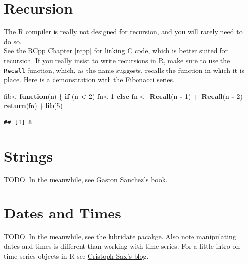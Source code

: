 \documentclass[]{book}
\newenvironment{Shaded}{\begin{snugshade}}{\end{snugshade}}
\newcommand{\KeywordTok}[1]{\textcolor[rgb]{0.13,0.29,0.53}{\textbf{#1}}}
\newcommand{\DecValTok}[1]{\textcolor[rgb]{0.00,0.00,0.81}{#1}}
\newcommand{\StringTok}[1]{\textcolor[rgb]{0.31,0.60,0.02}{#1}}
\newcommand{\ControlFlowTok}[1]{\textcolor[rgb]{0.13,0.29,0.53}{\textbf{#1}}}
\newcommand{\OperatorTok}[1]{\textcolor[rgb]{0.81,0.36,0.00}{\textbf{#1}}}
\newcommand{\NormalTok}[1]{#1}
\theoremstyle{definition}
\theoremstyle{definition}
\theoremstyle{definition}
\theoremstyle{remark}
\begin{document}
\section{Recursion}\label{recursion}

The R compiler is really not designed for recursion, and you will rarely
need to do so.\\
See the RCpp Chapter \ref{rcpp} for linking C code, which is better
suited for recursion. If you really insist to write recursions in R,
make sure to use the \texttt{Recall} function, which, as the name
suggests, recalls the function in which it is place. Here is a
demonstration with the Fibonacci series.

\begin{Shaded}
\begin{Highlighting}[]
\NormalTok{fib<-}\ControlFlowTok{function}\NormalTok{(n) \{}
    \ControlFlowTok{if}\NormalTok{ (n }\OperatorTok{<}\StringTok{ }\DecValTok{2}\NormalTok{) fn<-}\DecValTok{1} 
    \ControlFlowTok{else}\NormalTok{ fn <-}\StringTok{ }\KeywordTok{Recall}\NormalTok{(n }\OperatorTok{-}\StringTok{ }\DecValTok{1}\NormalTok{) }\OperatorTok{+}\StringTok{ }\KeywordTok{Recall}\NormalTok{(n }\OperatorTok{-}\StringTok{ }\DecValTok{2}\NormalTok{) }
    \KeywordTok{return}\NormalTok{(fn)}
\NormalTok{\} }
\KeywordTok{fib}\NormalTok{(}\DecValTok{5}\NormalTok{)}
\end{Highlighting}
\end{Shaded}

\begin{verbatim}
## [1] 8
\end{verbatim}

\section{Strings}\label{strings}

TODO. In the meanwhile, see
\href{http://www.gastonsanchez.com/r4strings/}{Gaston Sanchez's book}.

\section{Dates and Times}\label{dates-and-times}

TODO. In the meanwhile, see the
\href{https://lubridate.tidyverse.org/}{lubridate} pacakge. Also note
manipulating dates and times is different than working with time series.
For a little intro on time-series objects in R see
\href{http://www.christophsax.com/2018/05/15/tsbox/}{Cristoph Sax's
blog}.
\end{document}

